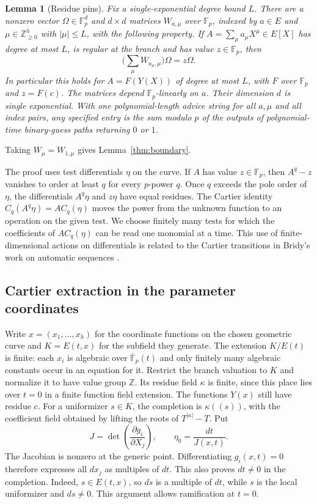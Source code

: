 \documentclass[11pt,letterpaper]{article}
\newtheorem{lemma}[theorem]{Lemma}
\theoremstyle{definition}
\numberwithin{equation}{section}
\begin{document}
\begin{lemma}[Residue pins]\label{thm:pins}
Fix a single-exponential degree bound $L$. There are a nonzero
vector $\Omega\in\mathbb{F}_p^d$ and $d\times d$ matrices $W_{a,\mu}$ over $\mathbb{F}_p$, indexed
by $a\in E$ and $\mu\in\mathbb{Z}_{\ge 0}^h$ with $|\mu|\le L$,
with the following property. If $A=\sum_\mu a_\mu X^\mu \in E[X]$ has degree at most $L$, is regular at the
branch and has value $z\in \mathbb{F}_p$, then
\begin{equation}\label{eq:eigenvector}
  \biggl(\sum_\mu W_{a_\mu,\mu}\biggr)\Omega=z\Omega.
\end{equation}
In particular this holds for $A=F(Y(X))$ of degree at most $L$, with $F$ over $\mathbb{F}_p$ and $z=F(c)$.
The matrices depend $\mathbb{F}_p$-linearly on $a$. Their dimension $d$ is single exponential. With one
polynomial-length advice string for all $a,\mu$ and all index pairs, any specified entry is the sum
modulo $p$ of the outputs of polynomial-time binary-guess paths returning $0$ or $1$.
\end{lemma}

Taking $W_\mu=W_{1,\mu}$ gives Lemma~\ref{thm:boundary}.

The proof uses test differentials $\eta$ on the curve. If $A$ has value $z\in \mathbb{F}_p$, then $A^q-z$
vanishes to order at least $q$ for every $p$-power $q$. Once $q$ exceeds the pole order of $\eta$, the
differentials $A^q \eta$ and $z\eta$ have equal residues. The Cartier identity $C_q(A^q \eta)=AC_q(\eta)$ moves
the power from the unknown function to an operation on the given test. We choose finitely
many tests for which the coefficients of $AC_q(\eta)$ can be read one monomial at a time. This use
of finite-dimensional actions on differentials is related to the Cartier transitions in Bridy's
work on automatic sequences \cite{Bridy}.

\subsection{Cartier extraction in the parameter coordinates}

Write $x=(x_1,\ldots,x_h)$ for the coordinate functions on the chosen geometric curve and
$K=E(t,x)$ for the subfield they generate. The extension $K/E(t)$ is finite: each $x_i$ is
algebraic over $\overline{\mathbb{F}}_p(t)$ and only finitely many algebraic constants occur in an equation for it.
Restrict the branch valuation to $K$ and normalize it to have value group $\mathbb{Z}$. Its residue
field $\kappa$ is finite, since this place lies over $t=0$ in a finite function field extension. The
functions $Y(x)$ still have residue $c$. For a uniformizer $s\in K$, the completion is $\kappa((s))$, with
the coefficient field obtained by lifting the roots of $T^{|\kappa|}-T$. Put
\[
  J = \det\left(\frac{\partial g_i}{\partial X_j}\right), \qquad \eta_0= \frac{dt}{J(x,t)}.
\]
The Jacobian is nonzero at the generic point. Differentiating $g_i(x,t)=0$ therefore expresses
all $dx_j$ as multiples of $dt$. This also proves $dt\ne 0$ in the completion. Indeed, $s\in E(t,x)$, so
$ds$ is a multiple of $dt$, while $s$ is the local uniformizer and $ds\ne 0$. This argument allows
ramification at $t=0$.
\end{document}
